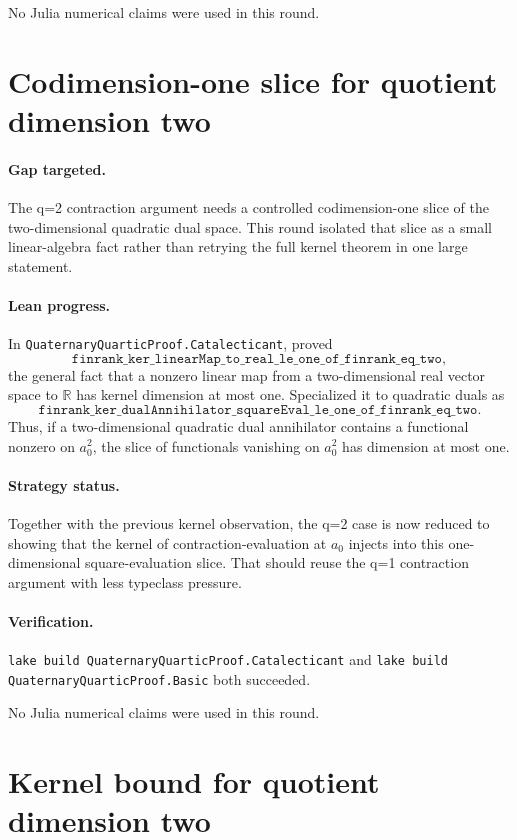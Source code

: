 \documentclass[11pt]{article}
\begin{document}
No Julia numerical claims were used in this round.

\section*{Codimension-one slice for quotient dimension two}

\paragraph{Gap targeted.}
The q=2 contraction argument needs a controlled codimension-one slice of the
two-dimensional quadratic dual space.  This round isolated that slice as a
small linear-algebra fact rather than retrying the full kernel theorem in one
large statement.

\paragraph{Lean progress.}
In \texttt{QuaternaryQuarticProof.Catalecticant}, proved
\[
\texttt{finrank\_ker\_linearMap\_to\_real\_le\_one\_of\_finrank\_eq\_two},
\]
the general fact that a nonzero linear map from a two-dimensional real vector
space to \(\mathbb R\) has kernel dimension at most one.  Specialized it to
quadratic duals as
\[
\texttt{finrank\_ker\_dualAnnihilator\_squareEval\_le\_one\_of\_finrank\_eq\_two}.
\]
Thus, if a two-dimensional quadratic dual annihilator contains a functional
nonzero on \(a_0^2\), the slice of functionals vanishing on \(a_0^2\) has
dimension at most one.

\paragraph{Strategy status.}
Together with the previous kernel observation, the q=2 case is now reduced to
showing that the kernel of contraction-evaluation at \(a_0\) injects into this
one-dimensional square-evaluation slice.  That should reuse the q=1
contraction argument with less typeclass pressure.

\paragraph{Verification.}
\texttt{lake build QuaternaryQuarticProof.Catalecticant} and
\texttt{lake build QuaternaryQuarticProof.Basic} both succeeded.

No Julia numerical claims were used in this round.

\section*{Kernel bound for quotient dimension two}
\end{document}
